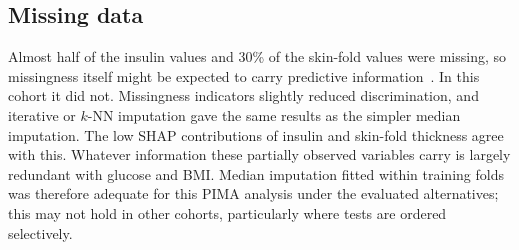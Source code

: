 \subsection{Missing data}
Almost half of the insulin values and 30\% of the skin-fold values were missing, so missingness itself might be expected to carry predictive information~\cite{sperrin2020missing}. In this cohort it did not. Missingness indicators slightly reduced discrimination, and iterative or $k$-NN imputation gave the same results as the simpler median imputation. The low SHAP contributions of insulin and skin-fold thickness agree with this. Whatever information these partially observed variables carry is largely redundant with glucose and BMI. Median imputation fitted within training folds was therefore adequate for this PIMA analysis under the evaluated alternatives; this may not hold in other cohorts, particularly where tests are ordered selectively.
